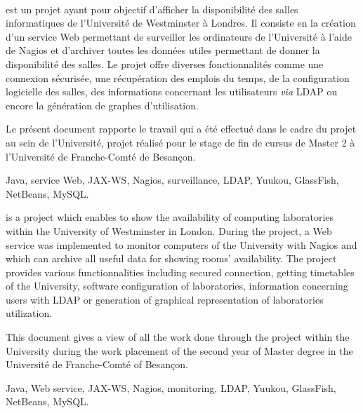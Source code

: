 ~
\vfill


{\YuukouII} est un projet ayant pour objectif d'afficher la disponibilit\'e des salles informatiques de l'Universit\'e de Westminster \`a Londres.
Il consiste en la cr\'eation d'un service Web permettant de surveiller les ordinateurs de l'Universit\'e \`a l'aide de Nagios et d'archiver toutes les donn\'ees utiles permettant de donner la disponibilit\'e des salles.
Le projet offre diverses fonctionnalit\'es comme une connexion s\'ecuris\'ee, une r\'ecup\'eration des emplois du temps, de la configuration logicielle des salles, des informations concernant les utilisateurs \textit{via} LDAP ou encore la g\'en\'eration de graphes d'utilisation.

Le pr\'esent document rapporte le travail qui a \'et\'e effectu\'e dans le cadre du projet {\YuukouII} au sein de l'Universit\'e, projet r\'ealis\'e pour le stage de fin de cursus de Master 2 \`a l'Universit\'e de Franche-Comt\'e de Besan\c{c}on.

\vspace{0.5cm}


Java, service Web, JAX-WS, Nagios, surveillance, LDAP, Yuukou, GlassFish, NetBeans, MySQL.

\vspace{1cm}


{\YuukouII} is a project which enables to show the availability of computing laboratories within the University of Westminster in London.
During the project, a Web service was implemented to monitor computers of the University with Nagios and which can archive all useful data for showing rooms' availability.
The project provides various functionnalities including secured connection, getting timetables of the University, software configuration of laboratories, information concerning users with LDAP or generation of graphical representation of laboratories utilization.

This document gives a view of all the work done through the project {\YuukouII} within the University during the work placement of the second year of Master degree in the Universit\'e de Franche-Comt\'e of Besan\c{c}on.

\vspace{0.5cm}


Java, Web service, JAX-WS, Nagios, monitoring, LDAP, Yuukou, GlassFish, NetBeans, MySQL.

\vfill
